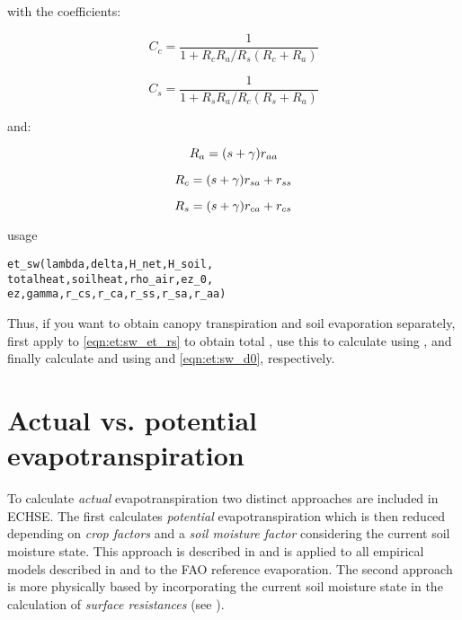 with the coefficients:

\begin{equation} \label{eqn:et:sw_et_cc}
C_c = \frac{1}{1 + R_c R_a / R_s (R_c + R_a)}
\end{equation}

\begin{equation} \label{eqn:et:sw_et_cs}
C_s = \frac{1}{1 + R_s R_a / R_c (R_s + R_a)}
\end{equation}

and:

\begin{equation} \label{eqn:et:sw_et_ra}
R_a = (s + \gamma) r_{aa}
\end{equation}

\begin{equation} \label{eqn:et:sw_et_rc}
R_c = (s + \gamma) r_{sa} + r_{ss}
\end{equation}

\begin{equation} \label{eqn:et:sw_et_rs}
R_s = (s + \gamma) r_{ca} + r_{cs}
\end{equation}

\noindent
usage
\begin{verbatim}
et_sw(lambda,delta,H_net,H_soil,
totalheat,soilheat,rho_air,ez_0,
ez,gamma,r_cs,r_ca,r_ss,r_sa,r_aa)
\end{verbatim}

Thus, if you want to obtain canopy transpiration and soil evaporation separately, first apply  to \ref{eqn:et:sw_et_rs} to obtain total \et{}, use this to calculate \vapPresDefCano{} using , and finally calculate \etTransp{} and \etEvap{} using  and \ref{eqn:et:sw_d0}, respectively.







\section{Actual vs. potential evapotranspiration} \label{sec:et:act}
To calculate \emph{actual} evapotranspiration two distinct approaches are included in ECHSE. The first calculates \emph{potential} evapotranspiration which is then reduced depending on \emph{crop factors} and a \emph{soil moisture factor} considering the current soil moisture state. This approach is described in  and is applied to all empirical models described in  and to the FAO reference evaporation. The second approach is more physically based by incorporating the current soil moisture state in the calculation of \emph{surface resistances} (see ).


